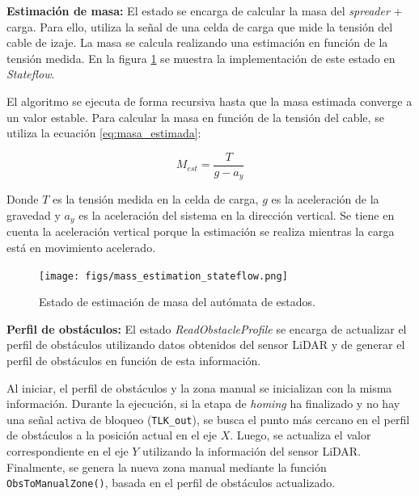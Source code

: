 \documentclass{article}
\begin{document}
        \textbf{Estimación de masa:}
            El estado se encarga de calcular la masa del \textit{spreader} + carga. Para ello, utiliza la señal de una celda de carga que mide la tensión del cable de izaje. La masa se calcula realizando una estimación en función de la tensión medida. En la figura \ref{fig:mass_estimation_stateflow} se muestra la implementación de este estado en \textit{Stateflow}. 

            El algoritmo se ejecuta de forma recursiva hasta que la masa estimada converge a un valor estable. Para calcular la masa en función de la tensión del cable, se utiliza la ecuación \ref{eq:masa_estimada}:

            \begin{equation} \label{eq:masa_estimada}
                M_{est} = \frac{T}{g - a_{y}}
            \end{equation}

            Donde \(T\) es la tensión medida en la celda de carga, \(g\) es la aceleración de la gravedad y \(a_{y}\) es la aceleración del sistema en la dirección vertical. Se tiene en cuenta la aceleración vertical porque la estimación se realiza mientras la carga está en movimiento acelerado.

            \begin{figure} [H]
                \centering
                \texttt{[image: figs/mass\_estimation\_stateflow.png]}
                \caption{Estado de estimación de masa del autómata de estados.}
                \label{fig:mass_estimation_stateflow}
            \end{figure}

        \textbf{Perfil de obstáculos:}
            El estado \textit{ReadObstacleProfile} se encarga de actualizar el perfil de obstáculos utilizando datos obtenidos del sensor LiDAR y de generar el perfil de obstáculos en función de esta información. 

            Al iniciar, el perfil de obstáculos y la zona manual se inicializan con la misma información. Durante la ejecución, si la etapa de \textit{homing} ha finalizado y no hay una señal activa de bloqueo (\texttt{TLK\_out}), se busca el punto más cercano en el perfil de obstáculos a la posición actual en el eje \(X\). Luego, se actualiza el valor correspondiente en el eje \(Y\) utilizando la información del sensor LiDAR. Finalmente, se genera la nueva zona manual mediante la función \texttt{ObsToManualZone()}, basada en el perfil de obstáculos actualizado.
\end{document}
